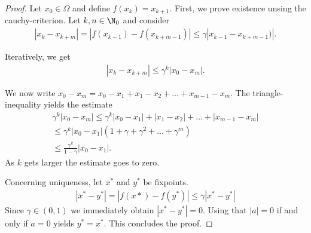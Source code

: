\begin{proof}
	Let $x_0 \in \Omega$ and define $f(x_k) = x_{k+1}$. First, we prove
	existence unsing the cauchy-criterion. Let $k, n \in \N_0$ and consider
	\begin{gather*}
	|x_k - x_{k+m} | = |f(x_{k-1}) - f(x_{k+m-1})| \le \gamma |x_{k-1} - x_{k+m-1})|.
	\end{gather*}

	Iteratively, we get
	\begin{gather*}
	|x_k - x_{k+m} | \le \gamma^k |x_0 - x_m|.
	\end{gather*}

	We now write $x_0 - x_m = x_0 - x_1 + x_1 - x_2 + \dots + x_{m-1} - x_m$.
	The triangle-inequality yields the estimate
	\begin{gather*}
	\gamma^k |x_0 - x_m| \le \gamma^k |x_0 - x_1| + |x_1 - x_2| + \dots + |x_{m-1} - x_m|  \\
	\le \gamma^k |x_0 - x_1| (1 + \gamma + \gamma ^2 + \dots + \gamma^m) \\
	\le \frac{\gamma^k}{1-\gamma} |x_0 - x_1|.
	\end{gather*}
	As $k$ gets larger the estimate goes to zero.

	Concerning uniqueness, let $x^*$ and $y^*$ be fixpoints.
	\begin{gather*}
	|x^* - y^*| = |f(x*) - f(y^*) | \le \gamma |x^* - y^*|
	\end{gather*}
	Since $\gamma \in (0,1)$ we immediately obtain $|x^* - y^*| = 0$. Using
	that $|a| = 0$ if and only if $a=0$ yields $y^* = x^*$. This concludes the proof.
\end{proof}


